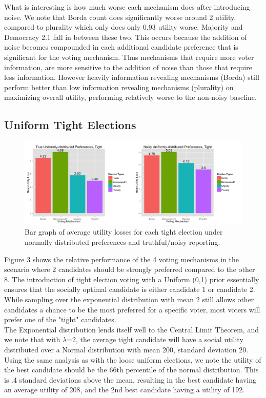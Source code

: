 \documentclass[11pt]{scrartcl}
\begin{document}
What is interesting is how much worse each mechanism does after introducing noise. We note that Borda count does significantly worse around 2 utility, compared to plurality which only does only 0.93 utility worse. Majority and Democracy 2.1 fall in between these two. This occurs because the addition of noise becomes compounded in each additional candidate preference that is significant for the voting mechanism. Thus mechanisms that require more voter information, are more sensitive to the addition of noise than those that require less information. However heavily information revealing mechanisms (Borda) still perform better than low information revealing mechanisms (plurality) on maximizing overall utility, performing relatively worse to the non-noisy baseline.


\subsection{Uniform Tight Elections}

\begin{figure}[H]\center
\includegraphics[scale=0.38]{uniform_tight_noisy.png}
\caption{Bar graph of average utility losses for each tight election under normally distributed preferences and truthful/noisy reporting.}
\end{figure}

Figure 3 shows the relative performance of the 4 voting mechanisms in the scenario where 2 candidates should be strongly preferred compared to the other 8. The introduction of tight election voting with a Uniform (0,1) prior essentially ensures that the socially optimal candidate is either candidate 1 or candidate 2. While sampling over the exponential distribution with mean 2 still allows other candidates a chance to be the most preferred for a specific voter, most voters will prefer one of the "tight" candidates.\\

The Exponential distribution lends itself well to the Central Limit Theorem, and we note that with $\lambda$=2, the average tight candidate will have a social utility distributed over a Normal distribution with mean 200, standard deviation 20. Using the same analysis as with the loose uniform elections, we note the utility of the best candidate should be the $66$th percentile of the normal distribution. This is .4 standard deviations above the mean, resulting in the best candidate having an average utility of 208, and the 2nd best candidate having a utility of 192.\\
\end{document}
